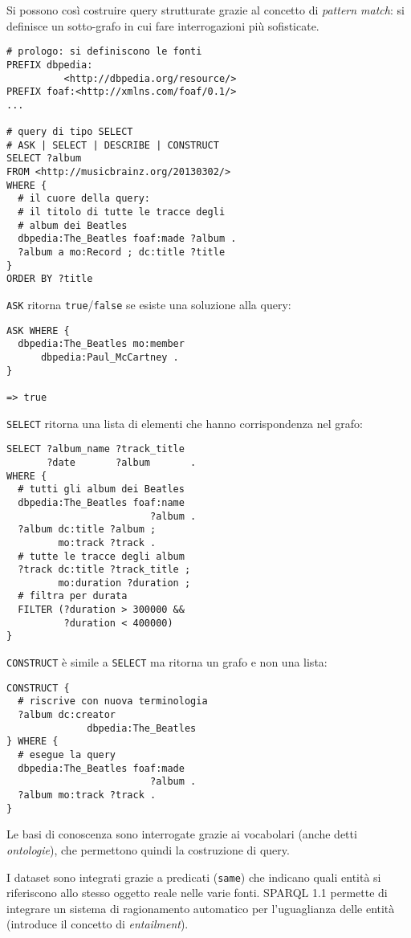 \documentclass[11pt]{article}
\begin{document}
\begin{multicols}{2}
Si possono così costruire query strutturate grazie al concetto di \textit{pattern match}: si definisce un sotto-grafo in cui fare interrogazioni più sofisticate.

\begin{verbatim}
# prologo: si definiscono le fonti
PREFIX dbpedia:
          <http://dbpedia.org/resource/>
PREFIX foaf:<http://xmlns.com/foaf/0.1/>
...

# query di tipo SELECT
# ASK | SELECT | DESCRIBE | CONSTRUCT
SELECT ?album
FROM <http://musicbrainz.org/20130302/>
WHERE {
  # il cuore della query:
  # il titolo di tutte le tracce degli
  # album dei Beatles
  dbpedia:The_Beatles foaf:made ?album .
  ?album a mo:Record ; dc:title ?title
}
ORDER BY ?title
\end{verbatim}

\verb|ASK| ritorna \verb|true|/\verb|false| se esiste una soluzione alla query:
\begin{verbatim}
ASK WHERE {
  dbpedia:The_Beatles mo:member
      dbpedia:Paul_McCartney .
}

=> true
\end{verbatim}

\verb|SELECT| ritorna una lista di elementi che hanno corrispondenza nel grafo:
\begin{verbatim}
SELECT ?album_name ?track_title
       ?date       ?album       .
WHERE {
  # tutti gli album dei Beatles
  dbpedia:The_Beatles foaf:name
                         ?album .
  ?album dc:title ?album ;
         mo:track ?track .
  # tutte le tracce degli album
  ?track dc:title ?track_title ;
         mo:duration ?duration ;
  # filtra per durata
  FILTER (?duration > 300000 &&
          ?duration < 400000)
}
\end{verbatim}

\verb|CONSTRUCT| è simile a \verb|SELECT| ma ritorna un grafo e non una lista:
\begin{verbatim}
CONSTRUCT {
  # riscrive con nuova terminologia
  ?album dc:creator
              dbpedia:The_Beatles
} WHERE {
  # esegue la query
  dbpedia:The_Beatles foaf:made
                         ?album .
  ?album mo:track ?track .
}
\end{verbatim}

Le basi di conoscenza sono interrogate grazie ai vocabolari (anche detti \textit{ontologie}), che permettono quindi la costruzione di query.

I dataset sono integrati grazie a predicati (\verb|same|) che indicano quali entità si riferiscono allo stesso oggetto reale nelle varie fonti.
SPARQL 1.1 permette di integrare un sistema di ragionamento automatico per l'uguaglianza delle entità (introduce il concetto di \textit{entailment}).


\end{multicols}
\end{document}
